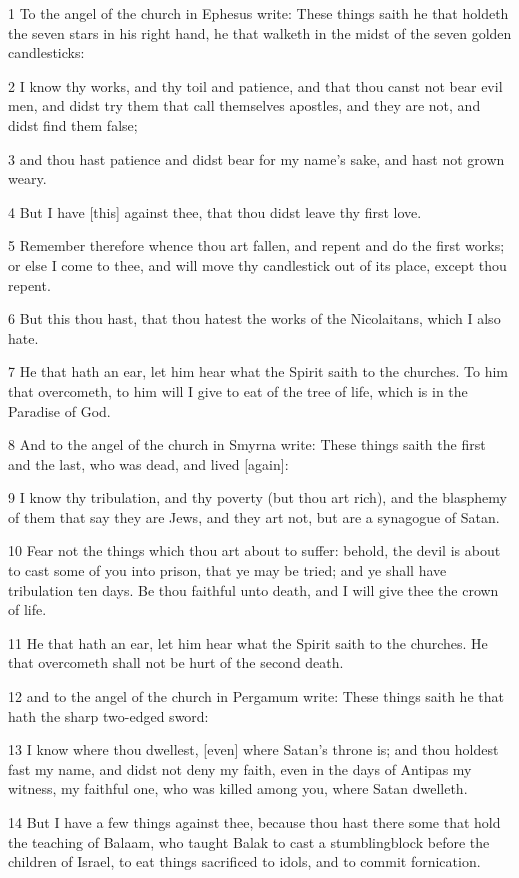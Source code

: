 \par 1 To the angel of the church in Ephesus write: These things saith he that holdeth the seven stars in his right hand, he that walketh in the midst of the seven golden candlesticks:
\par 2 I know thy works, and thy toil and patience, and that thou canst not bear evil men, and didst try them that call themselves apostles, and they are not, and didst find them false;
\par 3 and thou hast patience and didst bear for my name's sake, and hast not grown weary.
\par 4 But I have [this] against thee, that thou didst leave thy first love.
\par 5 Remember therefore whence thou art fallen, and repent and do the first works; or else I come to thee, and will move thy candlestick out of its place, except thou repent.
\par 6 But this thou hast, that thou hatest the works of the Nicolaitans, which I also hate.
\par 7 He that hath an ear, let him hear what the Spirit saith to the churches. To him that overcometh, to him will I give to eat of the tree of life, which is in the Paradise of God.
\par 8 And to the angel of the church in Smyrna write: These things saith the first and the last, who was dead, and lived [again]:
\par 9 I know thy tribulation, and thy poverty (but thou art rich), and the blasphemy of them that say they are Jews, and they art not, but are a synagogue of Satan.
\par 10 Fear not the things which thou art about to suffer: behold, the devil is about to cast some of you into prison, that ye may be tried; and ye shall have tribulation ten days. Be thou faithful unto death, and I will give thee the crown of life.
\par 11 He that hath an ear, let him hear what the Spirit saith to the churches. He that overcometh shall not be hurt of the second death.
\par 12 and to the angel of the church in Pergamum write: These things saith he that hath the sharp two-edged sword:
\par 13 I know where thou dwellest, [even] where Satan's throne is; and thou holdest fast my name, and didst not deny my faith, even in the days of Antipas my witness, my faithful one, who was killed among you, where Satan dwelleth.
\par 14 But I have a few things against thee, because thou hast there some that hold the teaching of Balaam, who taught Balak to cast a stumblingblock before the children of Israel, to eat things sacrificed to idols, and to commit fornication.
